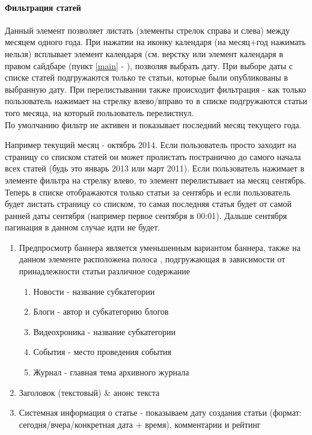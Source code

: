 \documentclass[DIV=calc, paper=a4, fontsize=11pt]{scrartcl} %
\begin{document}
\paragraph{Фильтрация статей}
Данный элемент позволяет листать (элементы стрелок справа и слева) между месяцем одного года. При нажатии на иконку календаря (на месяц+год нажимать нельзя) всплывает элемент календаря (см. верстку или элемент календаря в правом сайдбаре (пункт \ref{main} - ), позволяя выбрать дату. При выборе даты с списке статей подгружаются только те статьи, которые были опубликованы в выбранную дату. При перелистывании также происходит фильтрация - как только пользователь нажимает на стрелку влево/вправо то в списке подгружаются статьи того месяца, на который пользователь перелистнул.
\\[0.5cm]
По умолчанию фильтр не активен и показывает последний месяц текущего года. 
\begin{framed}
Например текущий месяц - октябрь 2014. Если пользователь просто заходит на страницу со списком статей он может пролистать постранично до самого начала всех статей (будь это январь 2013 или март 2011). Если пользователь нажимает в элементе фильтра на стрелку влево, то элемент перелистывает на месяц сентябрь. Теперь в списке отображаются только статьи за сентябрь и если пользователь будет листать страницу со списком, то самая последняя статья будет от самой ранней даты сентября (например первое сентября в 00:01). Дальше сентября пагинация в данном случае идти не будет.
\end{framed}


\begin{enumerate}
    \item Предпросмотр баннера является уменьшенным вариантом баннера, также на данном элементе расположена полоса \label{whiteline}, подгружающая в зависимости от принадлежности статьи различное содержание
    \begin{enumerate}
        \item Новости - название субкатегории
        \item Блоги - автор и субкатегорию блогов
        \item Видеохроника - название субкатегории
        \item События - место проведения события
        \item Журнал - главная тема архивного журнала
    \end{enumerate}
    \item Заголовок (текстовый) \& анонс текста
    \item Системная информация о статье - показываем дату создания статьи (формат: сегодня/вчера/конкретная дата + время), комментарии и рейтинг
\end{enumerate}
\end{document}
